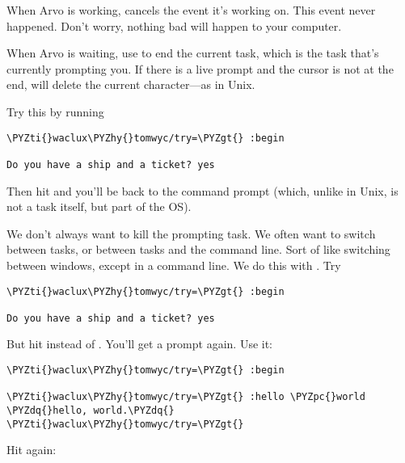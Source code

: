 When Arvo is working,  cancels the event it's working on.
This event never happened.  Don't worry, nothing bad will happen
to your computer.

When Arvo is waiting, use  to end the current task, which is
the task that's currently prompting you.  If there is a live
prompt and the cursor is not at the end,  will delete the
current character---as in Unix.

Try this by running

\begin{framed_shaded}
\begin{Verbatim}[fontsize=\relsize{-2.5},fontseries=b,commandchars=\\\{\}]
\PYZti{}waclux\PYZhy{}tomwyc/try=\PYZgt{} :begin

Do you have a ship and a ticket? yes
\end{Verbatim}
\end{framed_shaded}
Then hit  and you'll be back to the command prompt (which,
unlike in Unix, is not a task itself, but part of the OS).

We don't always want to kill the prompting task.  We often want
to switch between tasks, or between tasks and the command line.
Sort of like switching between windows, except in a command line.
We do this with .  Try

\begin{framed_shaded}
\begin{Verbatim}[fontsize=\relsize{-2.5},fontseries=b,commandchars=\\\{\}]
\PYZti{}waclux\PYZhy{}tomwyc/try=\PYZgt{} :begin

Do you have a ship and a ticket? yes
\end{Verbatim}
\end{framed_shaded}
But hit  instead of .  You'll get a prompt again.  Use
it:

\begin{framed_shaded}
\begin{Verbatim}[fontsize=\relsize{-2.5},fontseries=b,commandchars=\\\{\}]
\PYZti{}waclux\PYZhy{}tomwyc/try=\PYZgt{} :begin

\PYZti{}waclux\PYZhy{}tomwyc/try=\PYZgt{} :hello \PYZpc{}world
\PYZdq{}hello, world.\PYZdq{}
\PYZti{}waclux\PYZhy{}tomwyc/try=\PYZgt{}
\end{Verbatim}
\end{framed_shaded}
Hit  again:

